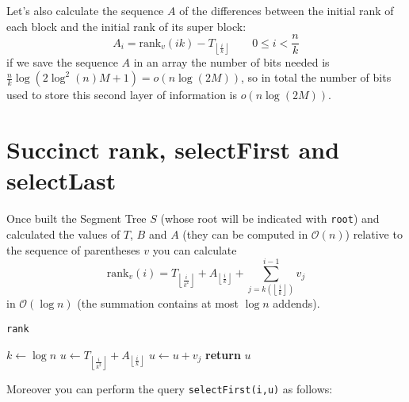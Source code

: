 \documentclass{article}
\begin{document}
Let's also calculate the sequence $A$ of the differences between the initial rank of each block and the initial rank of its super block:
    $$
    A_i = \text{rank}_v(ik)-T_{\left\lfloor{\frac{i}{k}}\right\rfloor} \qquad 0\leq i < \frac{n}{k}
    $$
if we save the sequence $A$ in an array the number of bits needed is $\frac{n}{k}\log{(2\log^2{(n)}M+1)}=o(n\log{(2M)})$, so in total the number of bits used to store this second layer of information is $o(n\log{(2M)})$.

\section{Succinct rank, selectFirst and selectLast}
Once built the Segment Tree $S$ (whose root will be indicated with \texttt{root}) and calculated the values of $T$, $B$ and $A$ (they can be computed in $\mathcal{O}(n)$) relative to the sequence of parentheses $v$ you can calculate
    $$\text{rank}_v(i) = T_{\left\lfloor{\frac{i}{k^2}}\right\rfloor}+A_{\left\lfloor{\frac{i}{k}}\right\rfloor}+\sum_{j=k(\left\lfloor{\frac{i}{k}}\right\rfloor)}^{i-1} v_j$$
in $\mathcal{O}(\log{n})$ (the summation contains at most $\log{n}$ addends). 
    \begin{algorithm}[H]
    \caption{\texttt{rank}}
    \begin{algorithmic}[1]
        \State $k\gets\log{n}$
        \State $u\gets T_{\left\lfloor{\frac{i}{k^2}}\right\rfloor}+A_{\left\lfloor{\frac{i}{k}}\right\rfloor}$
            \State $u\gets u+v_j$
        \EndFor
        \State \textbf{return} $u$
    \EndProcedure
    \end{algorithmic}
    \end{algorithm}
Moreover you can perform the query \texttt{selectFirst(i,u)} as follows:
\end{document}
